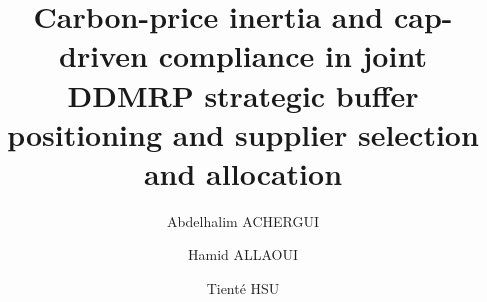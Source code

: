 \documentclass[preprint,12pt,authoryear]{elsarticle}
\begin{document}
\begin{frontmatter}



\title{Carbon-price inertia and cap-driven compliance in joint DDMRP strategic buffer positioning and supplier selection and allocation}


\author[1]{Abdelhalim ACHERGUI}
\author[1]{Hamid ALLAOUI}
\author[1]{Tienté HSU}



\end{frontmatter}
\end{document}
